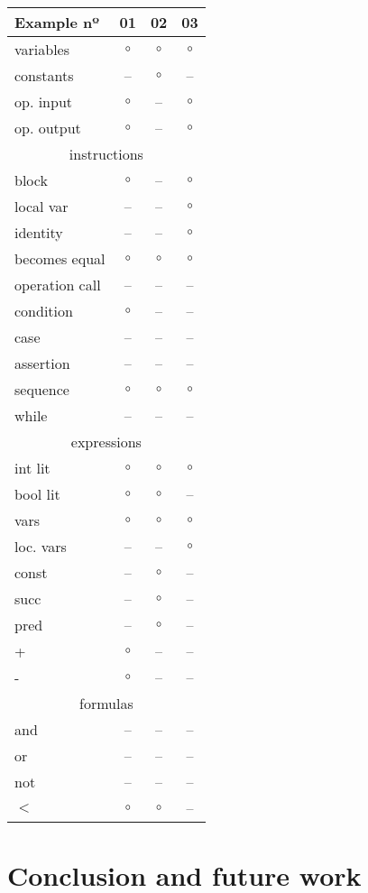 \documentclass{llncs}
\begin{document}
\begin{center}
\newcommand{\no}[0]{--}
\newcommand{\yes}[0]{$\circ$}
\begin{tabular}{|l|c|c|c|}
\hline
Example nº & 01 & 02 & 03 \\
\hline
variables & \yes & \yes & \yes \\
constants & \no & \yes & \no \\
op. input & \yes & \no & \yes \\
op. output & \yes & \no & \yes \\
\hline
\multicolumn{4}{|c|}{instructions} \\
\hline
block & \yes & \no & \yes \\
local var & \no & \no & \yes \\
identity & \no & \no & \yes \\
becomes equal & \yes & \yes & \yes \\
operation call & \no & \no & \no\\
condition & \yes & \no & \no\\
case & \no & \no & \no\\
assertion & \no & \no & \no\\
sequence & \yes & \yes & \yes\\
while & \no & \no & \no\\
\hline
\multicolumn{4}{|c|}{expressions} \\
\hline
int lit & \yes & \yes & \yes \\
bool lit & \yes & \yes & \no \\
vars & \yes & \yes & \yes \\
loc. vars & \no & \no & \yes \\
const & \no & \yes & \no \\ 
succ & \no & \yes & \no \\
pred & \no & \yes & \no \\
+ & \yes & \no & \no \\
- & \yes & \no & \no \\
\hline
\multicolumn{4}{|c|}{formulas} \\
\hline
and & \no & \no & \no \\
or & \no & \no & \no \\
not & \no & \no & \no \\
$<$ & \yes & \yes & \no \\
\hline
\end{tabular}
\end{center}

\section{Conclusion and future work}
\label{sec:conclusion}
\end{document}

